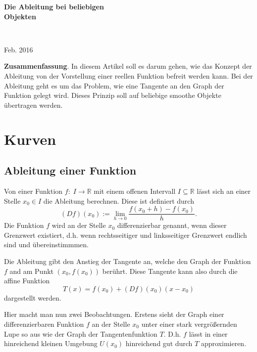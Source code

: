 \documentclass[a4paper,12pt,fleqn]{article}
\begin{document}
\begin{center}
\begin{LARGE}
\noindent
\textbf{Die Ableitung bei beliebigen\\
Objekten}
\end{LARGE}
\\
\vspace{2mm}
\begin{large}
Feb. 2016
\end{large}
\end{center}

\tableofcontents
\vspace{4mm}
\noindent
\textbf{Zusammenfassung}. In diesem Artikel soll es darum gehen,
wie das Konzept der Ableitung von der Vorstellung einer reellen
Funktion befreit werden kann. Bei der Ableitung geht es um das
Problem, wie eine Tangente an den Graph der Funktion gelegt wird.
Dieses Prinzip soll auf beliebige {\glqq}smoothe{\grqq} Objekte
übertragen werden.

\newpage
\section{Kurven}
\subsection{Ableitung einer Funktion}

Von einer Funktion \(f{:}\;I{\rightarrow}\mathbb R\) mit einem
offenen Intervall \(I{\subseteq}\mathbb R\) lässt sich an einer
Stelle \(x_0{\in}I\) die Ableitung berechnen. Diese ist definiert
durch
\begin{equation}
(Df)(x_0) := \lim_{h\rightarrow 0} \frac{f(x_0+h)-f(x_0)}{h}.
\end{equation}
Die Funktion \(f\) wird an der Stelle \(x_0\) differenzierbar genannt,
wenn dieser Grenzwert existiert, d.h. wenn rechtsseitiger und
linksseitiger Grenzwert endlich sind und übereinstimmmen.

Die Ableitung gibt den Anstieg der Tangente an, welche den Graph
der Funktion \(f\) and am Punkt \((x_0,f(x_0))\) berührt. Diese
Tangente kann also durch die affine Funktion
\begin{equation}
T(x) = f(x_0)+(Df)(x_0)(x-x_0)
\end{equation}
dargestellt werden.

Hier macht man nun zwei Beobachtungen. Erstens sieht der Graph einer
differenzierbaren Funktion \(f\) an der Stelle \(x_0\) unter einer
stark vergrößernden Lupe so aus wie der Graph der Tangentenfunktion
\(T\). D.h. \(f\) lässt in einer hinreichend kleinen
Umgebung \(U(x_0)\) hinreichend gut durch \(T\) approximieren.
\end{document}
